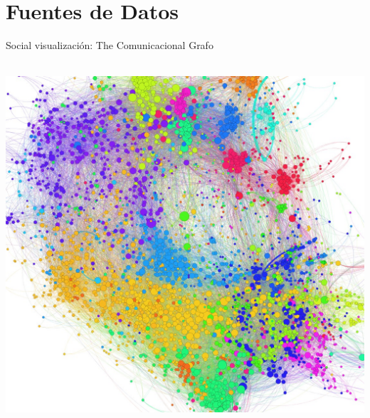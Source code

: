 \documentclass{beamer}
\begin{document}
%


\section{Fuentes de Datos}


\begin{frame}{Social visualización: The Comunicacional Grafo}

	\center\
	\includegraphics[width = 1.0 \textwidth, trim = 0 0 0 0cm, clip = true]
	{slides/Graph-screenshot.jpg}

\end{frame}
\end{document}
